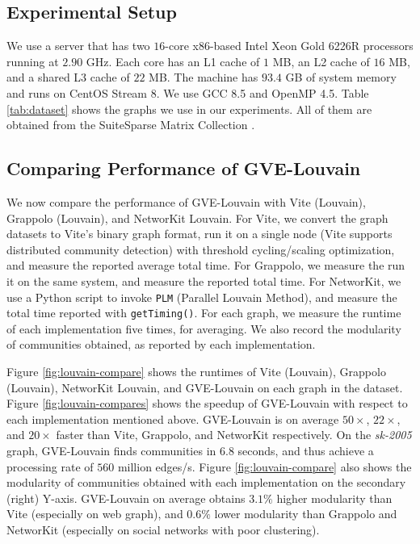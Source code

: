 \subsection{Experimental Setup}
\label{sec:setup}

We use a server that has two $16$-core x86-based Intel Xeon Gold 6226R processors running at $2.90$ GHz. Each core has an L1 cache of $1$ MB, an L2 cache of $16$ MB, and a shared L3 cache of $22$ MB. The machine has $93.4$ GB of system memory and runs on CentOS Stream 8. We use GCC 8.5 and OpenMP 4.5. Table \ref{tab:dataset} shows the graphs we use in our experiments. All of them are obtained from the SuiteSparse Matrix Collection \cite{suite19}.









\subsection{Comparing Performance of GVE-Louvain}

We now compare the performance of GVE-Louvain with Vite (Louvain), Grappolo (Louvain), and NetworKit Louvain. For Vite, we convert the graph datasets to Vite's binary graph format, run it on a single node (Vite supports distributed community detection) with threshold cycling/scaling optimization, and measure the reported average total time. For Grappolo, we measure the run it on the same system, and measure the reported total time. For NetworKit, we use a Python script to invoke \texttt{PLM} (Parallel Louvain Method), and measure the total time reported with \texttt{getTiming()}. For each graph, we measure the runtime of each implementation five times, for averaging. We also record the modularity of communities obtained, as reported by each implementation.

Figure \ref{fig:louvain-compare} shows the runtimes of Vite (Louvain), Grappolo (Louvain), NetworKit Louvain, and GVE-Louvain on each graph in the dataset. Figure \ref{fig:louvain-compares} shows the speedup of GVE-Louvain with respect to each implementation mentioned above. GVE-Louvain is on average $50\times$, $22\times$, and $20\times$ faster than Vite, Grappolo, and NetworKit respectively. On the \textit{sk-2005} graph, GVE-Louvain finds communities in $6.8$ seconds, and thus achieve a processing rate of $560$ million edges/s. Figure \ref{fig:louvain-compare} also shows the modularity of communities obtained with each implementation on the secondary (right) Y-axis. GVE-Louvain on average obtains $3.1\%$ higher modularity than Vite (especially on web graph), and $0.6\%$ lower modularity than Grappolo and NetworKit (especially on social networks with poor clustering).

